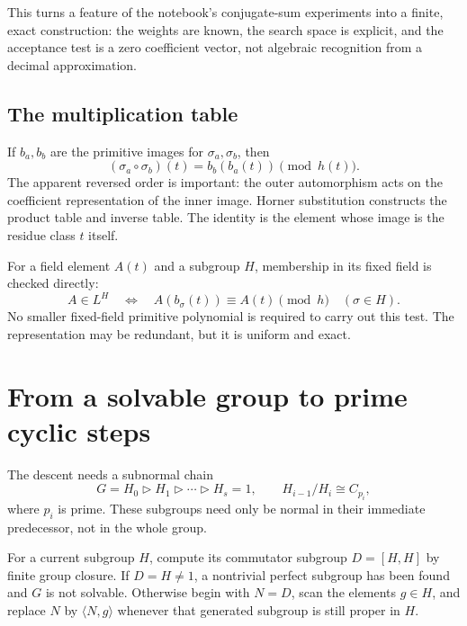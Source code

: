 \documentclass[11pt]{article}
\theoremstyle{definition}\newtheorem{definition}[theorem]{Definition}
\theoremstyle{remark}\newtheorem{remark}[theorem]{Remark}
\begin{document}
This turns a feature of the notebook's conjugate-sum experiments into a finite,
exact construction: the weights are known, the search space is explicit, and
the acceptance test is a zero coefficient vector, not algebraic recognition
from a decimal approximation.

\subsection{The multiplication table}

If $b_a,b_b$ are the primitive images for $\sigma_a,\sigma_b$, then
\begin{equation}
 (\sigma_a\circ\sigma_b)(t)=b_b(b_a(t))\pmod {h(t)}.
\end{equation}
The apparent reversed order is important: the outer automorphism acts on the
coefficient representation of the inner image. Horner substitution constructs
the product table and inverse table. The identity is the element whose image
is the residue class $t$ itself.

For a field element $A(t)$ and a subgroup $H$, membership in its fixed field is
checked directly:
\begin{equation}\label{eq:fixedtest}
 A\in L^H\quad\Longleftrightarrow\quad
 A(b_\sigma(t))\equiv A(t)\pmod h\quad(\sigma\in H).
\end{equation}
No smaller fixed-field primitive polynomial is required to carry out this test.
The representation may be redundant, but it is uniform and exact.

\section{From a solvable group to prime cyclic steps}\label{sec:chain}

The descent needs a subnormal chain
\begin{equation}\label{eq:chain}
 G=H_0\triangleright H_1\triangleright\cdots\triangleright H_s=1,
 \qquad H_{i-1}/H_i\cong C_{p_i},
\end{equation}
where $p_i$ is prime. These subgroups need only be normal in their immediate
predecessor, not in the whole group.

For a current subgroup $H$, compute its commutator subgroup $D=[H,H]$ by finite
group closure. If $D=H\ne1$, a nontrivial perfect subgroup has been found and
$G$ is not solvable. Otherwise begin with $N=D$, scan the elements $g\in H$,
and replace $N$ by $\langle N,g\rangle$ whenever that generated subgroup is
still proper in $H$.
\end{document}
